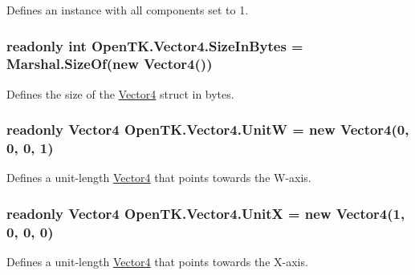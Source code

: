 Defines an instance with all components set to 1. 

\hypertarget{struct_open_t_k_1_1_vector4_a9794982f6a708d35bdfb9cec9bf38f47}{
\subsubsection[{Size\-In\-Bytes}]{\setlength{\rightskip}{0pt plus 5cm}readonly int Open\-T\-K.\-Vector4.\-Size\-In\-Bytes = Marshal.\-Size\-Of(new {\bf Vector4}())\hspace{0.3cm}{\ttfamily [static]}}}\label{struct_open_t_k_1_1_vector4_a9794982f6a708d35bdfb9cec9bf38f47}


Defines the size of the \hyperlink{struct_open_t_k_1_1_vector4}{Vector4} struct in bytes. 

\hypertarget{struct_open_t_k_1_1_vector4_ac56f2979d015c23002983614a97b3226}{
\subsubsection[{Unit\-W}]{\setlength{\rightskip}{0pt plus 5cm}readonly {\bf Vector4} Open\-T\-K.\-Vector4.\-Unit\-W = new {\bf Vector4}(0, 0, 0, 1)\hspace{0.3cm}{\ttfamily [static]}}}\label{struct_open_t_k_1_1_vector4_ac56f2979d015c23002983614a97b3226}


Defines a unit-\/length \hyperlink{struct_open_t_k_1_1_vector4}{Vector4} that points towards the W-\/axis. 

\hypertarget{struct_open_t_k_1_1_vector4_ad3b78911d7b6438c95ec666d49698487}{
\subsubsection[{Unit\-X}]{\setlength{\rightskip}{0pt plus 5cm}readonly {\bf Vector4} Open\-T\-K.\-Vector4.\-Unit\-X = new {\bf Vector4}(1, 0, 0, 0)\hspace{0.3cm}{\ttfamily [static]}}}\label{struct_open_t_k_1_1_vector4_ad3b78911d7b6438c95ec666d49698487}


Defines a unit-\/length \hyperlink{struct_open_t_k_1_1_vector4}{Vector4} that points towards the X-\/axis. 

